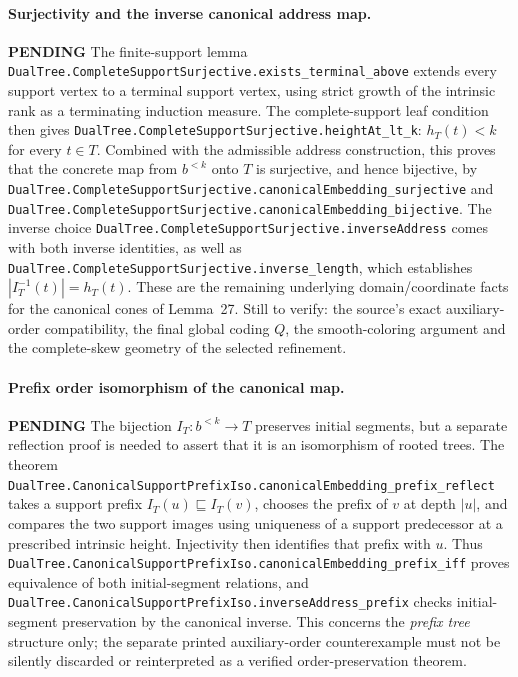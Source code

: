 \documentclass[11pt]{article}
\newcommand{\todo}{\textcolor{gray!70!black}{\textbf{PENDING}}}
\newcommand{\lean}[1]{\texttt{#1}}
\begin{document}
\paragraph{Surjectivity and the inverse canonical address map.} \todo
The finite-support lemma
\lean{DualTree.CompleteSupportSurjective.exists_terminal_above}
extends every support vertex to a terminal support vertex, using
strict growth of the intrinsic rank as a terminating induction
measure.  The complete-support leaf condition then gives
\lean{DualTree.CompleteSupportSurjective.heightAt_lt_k}:
$h_T(t)<k$ for every $t\in T$.
Combined with the admissible address construction, this proves
that the concrete map from $b^{<k}$ onto $T$ is surjective,
and hence bijective, by
\lean{DualTree.CompleteSupportSurjective.canonicalEmbedding_surjective}
and \lean{DualTree.CompleteSupportSurjective.canonicalEmbedding_bijective}.
The inverse choice
\lean{DualTree.CompleteSupportSurjective.inverseAddress}
comes with both inverse identities, as well as
\lean{DualTree.CompleteSupportSurjective.inverse_length},
which establishes $|I_T^{-1}(t)|=h_T(t)$.
These are the remaining underlying domain/coordinate facts for
the canonical cones of Lemma~27.
Still to verify: the source's exact auxiliary-order compatibility,
the final global coding $Q$, the smooth-coloring argument and
the complete-skew geometry of the selected refinement.


\paragraph{Prefix order isomorphism of the canonical map.} \todo
The bijection $I_T:b^{<k}\to T$ preserves initial segments,
but a separate reflection proof is needed to assert that it is
an isomorphism of rooted trees.  The theorem
\lean{DualTree.CanonicalSupportPrefixIso.canonicalEmbedding_prefix_reflect}
takes a support prefix $I_T(u)\sqsubseteq I_T(v)$, chooses the
prefix of $v$ at depth $|u|$, and compares the two support images
using uniqueness of a support predecessor at a prescribed intrinsic
height.  Injectivity then identifies that prefix with $u$.
Thus \lean{DualTree.CanonicalSupportPrefixIso.canonicalEmbedding_prefix_iff}
proves equivalence of both initial-segment relations, and
\lean{DualTree.CanonicalSupportPrefixIso.inverseAddress_prefix}
checks initial-segment preservation by the canonical inverse.
This concerns the \emph{prefix tree} structure only; the separate
printed auxiliary-order counterexample must not be silently
discarded or reinterpreted as a verified order-preservation theorem.
\end{document}
